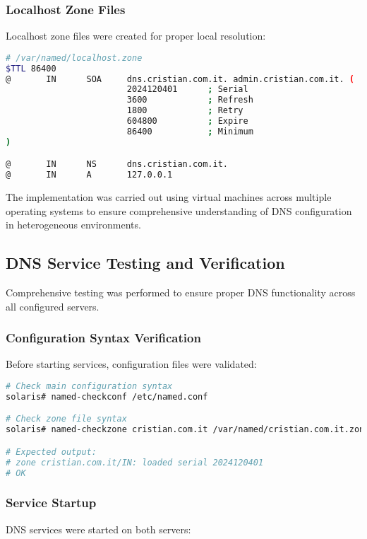 \documentclass[12pt,a4paper]{article}
\begin{document}
\subsubsection{Localhost Zone Files}
Localhost zone files were created for proper local resolution:

\begin{lstlisting}[language=bash, caption=Localhost Zone Configuration]
# /var/named/localhost.zone
$TTL 86400
@       IN      SOA     dns.cristian.com.it. admin.cristian.com.it. (
                        2024120401      ; Serial
                        3600            ; Refresh
                        1800            ; Retry
                        604800          ; Expire
                        86400           ; Minimum
)

@       IN      NS      dns.cristian.com.it.
@       IN      A       127.0.0.1
\end{lstlisting}

The implementation was carried out using virtual machines across multiple operating systems to ensure comprehensive understanding of DNS configuration in heterogeneous environments.

\subsection{DNS Service Testing and Verification}\label{subsec:dns-testing}

Comprehensive testing was performed to ensure proper DNS functionality across all configured servers.

\subsubsection{Configuration Syntax Verification}
Before starting services, configuration files were validated:

\begin{lstlisting}[language=bash, caption=Configuration Validation]
# Check main configuration syntax
solaris# named-checkconf /etc/named.conf

# Check zone file syntax
solaris# named-checkzone cristian.com.it /var/named/cristian.com.it.zone

# Expected output:
# zone cristian.com.it/IN: loaded serial 2024120401
# OK
\end{lstlisting}

\subsubsection{Service Startup}
DNS services were started on both servers:
\end{document}
